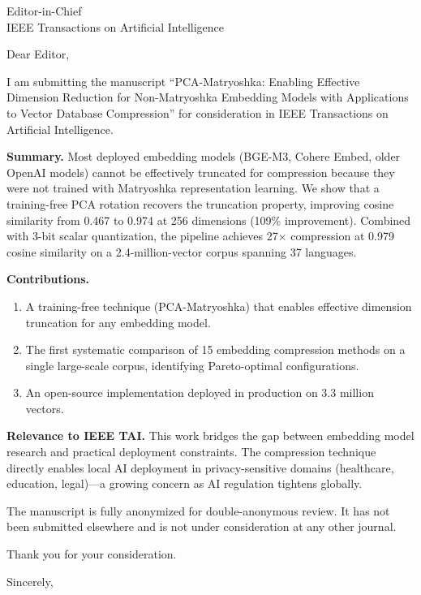 \documentclass[11pt]{letter}
\begin{document}
\begin{letter}{Editor-in-Chief\\
IEEE Transactions on Artificial Intelligence}

\opening{Dear Editor,}

I am submitting the manuscript ``PCA-Matryoshka: Enabling Effective
Dimension Reduction for Non-Matryoshka Embedding Models with
Applications to Vector Database Compression'' for consideration in
IEEE Transactions on Artificial Intelligence.

\textbf{Summary.}  Most deployed embedding models (BGE-M3, Cohere
Embed, older OpenAI models) cannot be effectively truncated for
compression because they were not trained with Matryoshka
representation learning.  We show that a training-free PCA rotation
recovers the truncation property, improving cosine similarity from
0.467 to 0.974 at 256 dimensions (109\% improvement).  Combined
with 3-bit scalar quantization, the pipeline achieves 27$\times$
compression at 0.979 cosine similarity on a 2.4-million-vector
corpus spanning 37 languages.

\textbf{Contributions.}
\begin{enumerate}
  \item A training-free technique (PCA-Matryoshka) that enables
  effective dimension truncation for any embedding model.
  \item The first systematic comparison of 15 embedding compression
  methods on a single large-scale corpus, identifying Pareto-optimal
  configurations.
  \item An open-source implementation deployed in production on
  3.3 million vectors.
\end{enumerate}

\textbf{Relevance to IEEE TAI.}  This work bridges the gap between
embedding model research and practical deployment constraints.  The
compression technique directly enables local AI deployment in
privacy-sensitive domains (healthcare, education, legal)---a growing
concern as AI regulation tightens globally.

The manuscript is fully anonymized for double-anonymous review.
It has not been submitted elsewhere and is not under consideration
at any other journal.

Thank you for your consideration.

\closing{Sincerely,}

\end{letter}
\end{document}
